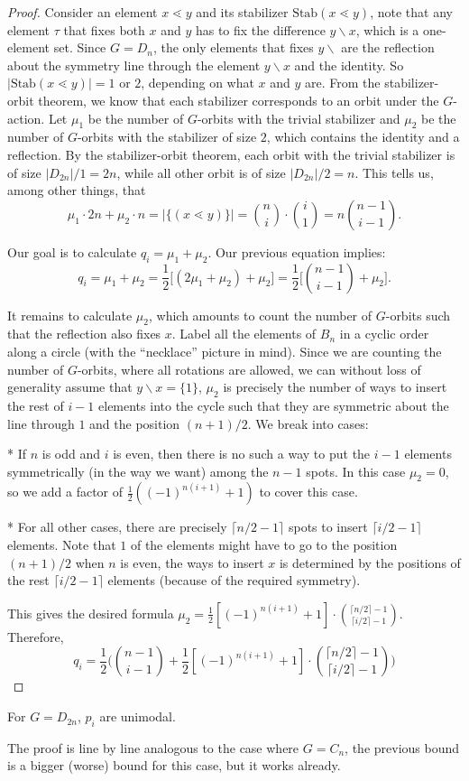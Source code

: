 \documentclass[12pt]{article}
\newcommand{\dstyle}{\displaystyle}
\newcommand{\1}{\mathbb{I}}
\newcommand{\minus}{\backslash}
\theoremstyle{definition}
\theoremstyle{definition}
\theoremstyle{definition}
\theoremstyle{definition}
\theoremstyle{definition}
\theoremstyle{definition}
\begin{document}
\begin{proof}

Consider an element $x \lessdot y$ and its stabilizer $\text{Stab}{(x \lessdot y)}$, note that any element $\tau $ that fixes both $x$ and $y$ has to fix the difference $y\minus x$, which is a one-element set. Since $G = D_n$, the only elements that fixes $y \minus $ are the reflection about the symmetry line through the element $y\minus x$ and the identity. So $|\text{Stab} (x \lessdot y)| = 1 $ or $2$, depending on what $x$ and $y$ are. From the stabilizer-orbit theorem, we know that each stabilizer corresponds to an orbit under the $G$-action. Let $\mu_1$ be the number of $G$-orbits with the trivial stabilizer and $\mu_2$ be the number of $G$-orbits with the stabilizer of size $2$, which contains the identity and a reflection. By the stabilizer-orbit theorem, each orbit with the trivial stabilizer is of size $|D_{2n}| /1 = 2n $, while all other orbit is of size $|D_{2n}|/2 = n$.  This tells us, among other things, that $$\mu_1 \cdot 2n + \mu_2 \cdot n = |\{(x \lessdot y)\}| = {n \choose i}  \cdot {i \choose 1} = n {n-1 \choose i -1}.$$

Our goal is to calculate $q_i = \mu_1 + \mu_2$. Our previous equation implies: $$ q_i = \mu_1 + \mu_2= \frac{1}{2} \Big[ (2 \mu_1 + \mu_2) + \mu_2   \Big] = \frac{1}{2} \Big[ {n -1 \choose i -1} + \mu_2   \Big].$$

It remains to calculate $\mu_2$, which amounts to count the number of $G$-orbits such that the reflection also fixes $x$. Label all the elements of $B_n$ in a cyclic order along a circle (with the ``necklace'' picture in mind). Since we are counting the number of $G$-orbits, where all rotations are allowed, we can without loss of generality assume that $y\minus x = \{1\}$, $\mu_2$ is precisely the number of ways to insert the rest of $i-1$ elements into the cycle such that they are symmetric about the line through $1$ and the position $(n+1)/2$.  We break into cases:

* If $n$ is odd and $i$ is even, then there is no such a way to put the $i-1$ elements symmetrically (in the way we want) among the $n-1$ spots. In this case $\mu_2=0$, so we add a factor of $\frac{1}{2} ((-1)^{n(i+1)} + 1)$ to cover this case. 

* For all other cases, there are precisely $\lceil n/2 -1\rceil$ spots to insert $\lceil i/2 - 1 \rceil$ elements. Note that $1$ of the elements might have to go to the position $(n+1)/2$ when $n$ is even, the ways to insert $x$ is determined by the positions of the rest $\lceil i/2 - 1 \rceil$ elements (because of the required symmetry). 

This gives the desired formula $\dstyle \mu_2 =  \frac{1}{2} [(-1)^{n(i+1)}+1] \cdot { \lceil n/2\rceil -1  \choose \lceil i/2 \rceil - 1}   $. Therefore, 
$$q_i = \frac{1}{2} \Big( {n-1 \choose i -1} + \frac{1}{2} [(-1)^{n(i+1)}+1] \cdot { \lceil n/2\rceil -1  \choose \lceil i/2 \rceil - 1}    \Big)$$
\end{proof}

\corollary For $G = D_{2n}$, $p_i$ are unimodal. 

\proof The proof is line by line analogous to the case where $G = C_n$, the previous bound is a bigger (worse) bound for this case, but it works already.
\end{document}
